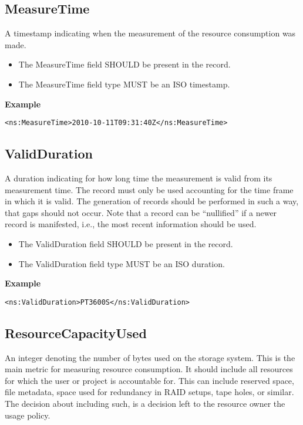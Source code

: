
\subsection{MeasureTime}

A timestamp indicating when the measurement of the resource consumption was
made.

\begin{itemize}
\item The MeasureTime field SHOULD be present in the record.
\item The MeasureTime field type MUST be an ISO timestamp.
\end{itemize}

{\bf Example}
\begin{verbatim}
<ns:MeasureTime>2010-10-11T09:31:40Z</ns:MeasureTime>
\end{verbatim}


\subsection{ValidDuration}

A duration indicating for how long time the measurement is valid from its
measurement time. The record must only be used accounting for the time frame in
which it is valid. The generation of records should be performed in such a way,
that gaps should not occur. Note that a record can be ``nullified'' if a newer
record is manifested, i.e., the most recent information should be used.

\begin{itemize}
\item The ValidDuration field SHOULD be present in the record.
\item The ValidDuration field type MUST be an ISO duration.
\end{itemize}

{\bf Example}
\begin{verbatim}
<ns:ValidDuration>PT3600S</ns:ValidDuration>
\end{verbatim}


\subsection{ResourceCapacityUsed}

An integer denoting the number of bytes used on the storage system. This is the
main metric for measuring resource consumption. It should include all resources
for which the user or project is accountable for. This can include reserved
space, file metadata, space used for redundancy in RAID setups, tape holes,
or similar. The decision about including such, is a decision left to the
resource owner the usage policy.

